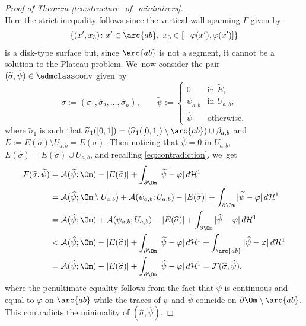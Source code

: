 \begin{proof}[Proof of Theorem \ref{teo:structure_of_minimizers}]
\begin{equation}
\end{equation}
Here the strict inequality follows since the vertical wall spanning $\Gamma$ given by
\[
\{(x',x_3)\colon x'\in\arc{ab},\ x_3\in[-\varphi(x'),\varphi(x')]\}
\]
is a disk-type surface but, since $\arc{ab}$ is not a segment, it cannot be a solution to the Plateau problem. We~now consider the pair $(\widetilde\sigma,\widetilde\psi)\in\admclassconv$ given by
\begin{equation}\label{def:sigma,psi}
\widetilde\sigma:=(\widetilde\sigma_1,\widehat\sigma_2,\dots,\widehat\sigma_n),\qquad
\widetilde\psi:=\begin{cases}
0&\text{in }\widetilde E,\\
\psi_{a,b}&\text{in }U_{a,b},\\
\widehat \psi&\text{otherwise},
\end{cases}
\end{equation}
where $\widetilde\sigma_1$ is such that $\widetilde\sigma_1([0,1])=(\widehat\sigma_1([0,1])\setminus\arc{ab})\cup\beta_{a,b}$ and $\widetilde{E}:= E(\widehat\sigma)\setminus U_{a,b}=E(\widetilde\sigma)$.
Then noticing that $\widehat\psi=0$ in $U_{a,b}$, $E(\widehat\sigma)=E(\widetilde\sigma)\cup U_{a,b}$, and recalling \eqref{eq:contradiction}, we~get
\begin{equation*}
\begin{split}
{\mathcal F}(\widetilde\sigma,\widetilde\psi)&=\mathcal{A}(\widetilde\psi;\Om)-|E(\widetilde\sigma)|+\int_{\partial\Om}|\widetilde\psi-\varphi|\,d\mathcal{H}^1\\
&=\mathcal{A}(\widehat\psi;\Om\setminus U_{a,b})+\mathcal{A}(\psi_{a,b};U_{a,b})-|E(\widetilde\sigma)|+\int_{\partial\Om}|\widetilde\psi-\varphi|\,d\mathcal{H}^1\\
&=\mathcal{A}(\widehat\psi;\Om)+\mathcal{A}(\psi_{a,b};U_{a,b})-|E(\widehat\sigma)|+\int_{\partial\Om}|\widehat\psi-\varphi|\,d\mathcal{H}^1\\
&<\mathcal{A}(\widehat\psi;\Om)-|E(\widehat\sigma)|+\int_{\partial\Om}|\widetilde\psi-\varphi|\,d\mathcal{H}^1+\int_{\arc{ab}}|\widehat\psi-\varphi|\,d\mathcal{H}^1\\
&=\mathcal{A}(\widehat\psi;\Om)-|E(\widehat\sigma)|+\int_{\partial\Om}|\widehat\psi-\varphi|\,d\mathcal{H}^1= {\mathcal F}(\widehat\sigma,\widehat\psi),
\end{split}
\end{equation*}
where the penultimate equality follows from the fact that $\widetilde\psi$ is continuous and equal to $\varphi$ on $\arc{ab}$ while the traces of $\widetilde\psi$ and $\widehat\psi$ coincide on $\partial\Om\setminus\arc{ab}$.
This contradicts the minimality of $(\widehat\sigma,\widehat\psi)$.


\end{proof}
